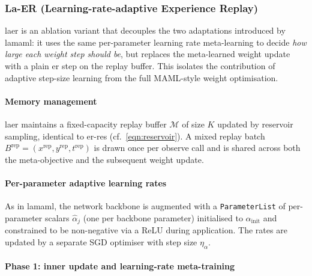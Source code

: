 \subsubsection{La-ER (Learning-rate-adaptive Experience Replay)}

\gls{laer} is an ablation variant that decouples the two adaptations introduced by \gls{lamaml}: it uses the same per-parameter learning rate meta-learning to decide \emph{how large each weight step should be}, but replaces the meta-learned weight update with a plain \gls{er} step on the replay buffer. This isolates the contribution of adaptive step-size learning from the full MAML-style weight optimisation.

\paragraph{Memory management}

\gls{laer} maintains a fixed-capacity replay buffer $\mathcal{M}$ of size $K$ updated by reservoir sampling, identical to \gls{er-res} (cf.\ \eqref{eqn:reservoir}). A mixed replay batch $B^\text{rep} = (x^\text{rep}, y^\text{rep}, t^\text{rep})$ is drawn once per observe call and is shared across both the meta-objective and the subsequent weight update.

\paragraph{Per-parameter adaptive learning rates}

As in \gls{lamaml}, the network backbone is augmented with a \texttt{ParameterList} of per-parameter scalars $\hat\alpha_j$ (one per backbone parameter) initialised to $\alpha_\text{init}$ and constrained to be non-negative via a ReLU during application. The rates are updated by a separate SGD optimiser with step size $\eta_\alpha$.

\paragraph{Phase 1: inner update and learning-rate meta-training}


